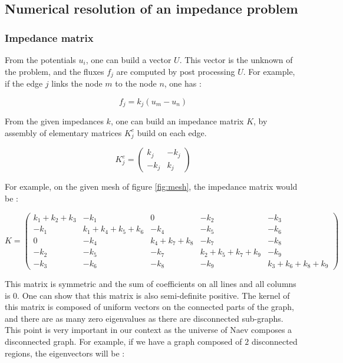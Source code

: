 \documentclass[11pt,a4paper]{article}		%
\begin{document}
\subsection{Numerical resolution of an impedance problem}

\subsubsection{Impedance matrix}

From the potentials $u_i$, one can build a vector $U$. This vector is the unknown of the problem, and the fluxes $f_j$ are computed by post processing $U$. For example, if the edge $j$ links the node $m$ to the node $n$, one has :

\begin{equation}\label{eqn:flux}
f_j = k_j(u_m-u_n)
\end{equation}

From the given impedances $k$, one can build an impedance matrix $K$, by assembly of elementary matrices $K_j^e$ build on each edge.

\begin{equation}
K_j^e = \begin{pmatrix} k_j & -k_j \\ -k_j & k_j \end{pmatrix}
\end{equation}

For example, on the given mesh of figure \ref{fig:mesh}, the impedance matrix would be :

\begin{equation}
K = \begin{pmatrix} k_1+k_2+k_3 & -k_1 & 0 & -k_2 & -k_3 \\
-k_1 & k_1+k_4+k_5+k_6 & -k_4 & -k_5 & -k_6 \\
0 & -k_4 & k_4+k_7+k_8 & -k_7 & -k_8 \\
-k_2 & -k_5 & -k_7 & k_2+k_5+k_7+k_9 & -k_9 \\
-k_3 & -k_6 & -k_8 & -k_9 & k_3+k_6+k_8+k_9 \end{pmatrix}
\end{equation}

This matrix is symmetric and the sum of coefficients on all lines and all columns is $0$. One can show that this matrix is also semi-definite positive. The kernel of this matrix is composed of uniform vectors on the connected parts of the graph, and there are as many zero eigenvalues as there are disconnected sub-graphs. This point is very important in our context as the universe of Naev composes a disconnected graph. For example, if we have a graph composed of $2$ disconnected regions, the eigenvectors will be :
\end{document}
